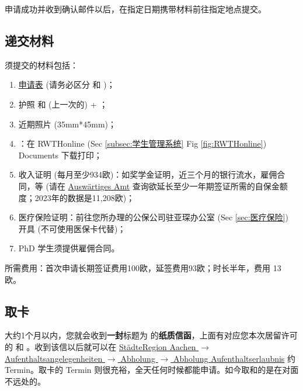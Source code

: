     申请成功并收到确认邮件以后，在指定日期携带材料前往指定地点提交。

  \subsection{递交材料}\label{subsec:递交材料}

    须提交的材料包括：
    \begin{enumerate}
      \item \href{https://bportal.staedteregion-aachen.de/staedteregion-a-z/-/egov-bis-detail/dienstleistung/15000/show}{申请表} (请务必区分 和 )；
      \item 护照 和 (上一次的)  + ；
      \item 近期照片 (35mm*45mm)；
      \item {}：在 RWTHonline (Sec \ref{subsec:学生管理系统} Fig \ref{fig:RWTHonline}) Documents 下载打印；
      \item 收入证明 (每月至少934欧)：如奖学金证明，近三个月的银行流水，雇佣合同，等 (请在 \href{https://www.auswaertiges-amt.de/de/sperrkonto/375488}{Auswärtiges Amt} 查询欲延长至少一年期签证所需的自保金额度；2023年的数据是11,208欧)；
      \item 医疗保险证明：前往您所办理的公保公司驻亚琛办公室 (Sec \ref{sec:医疗保险}) 开具 (不可使用医保卡代替)；
      \item PhD 学生须提供雇佣合同。
    \end{enumerate}
    所需费用：首次申请长期签证费用100欧，延签费用93欧；时长半年，费用 13 欧。

  \subsection{取卡}\label{subsec:取卡}

    大约1个月以内，您就会收到\textbf{一封}标题为  的\textbf{纸质信函}，上面有对应您本次居留许可的  和 。收到该信以后就可以在 \href{https://termine.staedteregion-aachen.de/auslaenderamt/}{StädteRegion Aachen $\rightarrow$ Aufenthaltsangelegenheiten $\rightarrow$  Abholung $\rightarrow$ Abholung Aufenthaltserlaubnis} 约 Termin。取卡的 Termin 则很充裕，全天任何时候都能申请。如今取和的是在对面不远处的。

